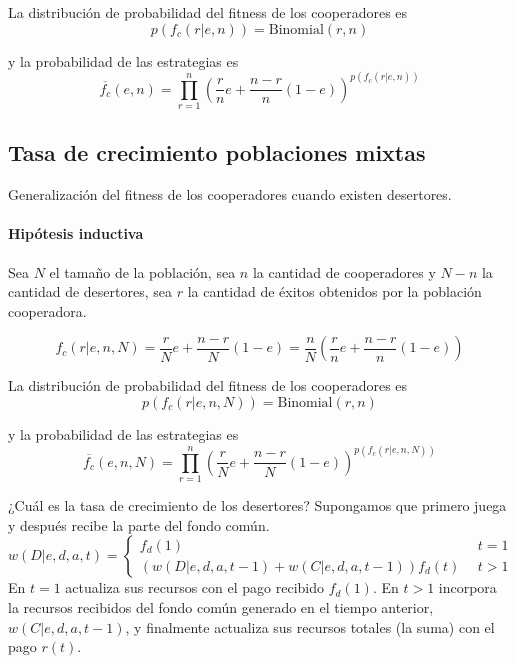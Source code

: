 \documentclass[a4paper,10pt]{article}
\begin{document}
La distribución de probabilidad del fitness de los cooperadores es
\begin{equation}
p(f_c(r|e,n)) = \text{Binomial}(r,n)
\end{equation}

y la probabilidad de las estrategias es
\begin{equation}
\overline{f_c}(e,n) = \prod_{r=1}^n \left( \frac{r}{n} e + \frac{n-r}{n}(1-e) \right)^{p(f_c(r|e,n))}
\end{equation}



\subsection{Tasa de crecimiento poblaciones mixtas}

Generalización del fitness de los cooperadores cuando existen desertores.

\paragraph{Hipótesis inductiva} Sea $N$ el tamaño de la población, sea $n$ la cantidad de cooperadores y $N-n$ la cantidad de desertores, sea  $r$ la cantidad de éxitos obtenidos por la población cooperadora.

\begin{equation}
f_c(r|e,n,N) =  \frac{r}{N} e + \frac{n-r}{N}(1-e) = \frac{n}{N} \left( \frac{r}{n} e + \frac{n-r}{n}(1-e) \right)
\end{equation}

La distribución de probabilidad del fitness de los cooperadores es
\begin{equation}
p(f_c(r|e,n,N)) = \text{Binomial}(r,n)
\end{equation}

y la probabilidad de las estrategias es
\begin{equation}
\overline{f_c}(e,n,N) = \prod_{r=1}^n \left( \frac{r}{N} e + \frac{n-r}{N}(1-e) \right)^{p(f_c(r|e,n,N))}
\end{equation}


¿Cuál es la tasa de crecimiento de los desertores?
Supongamos que primero juega y después recibe la parte del fondo común.
\begin{equation}
w(D|e,d,a,t) =
\begin{cases}
 f_d(1) & \ \  t=1 \\
 (w(D|e,d,a,t-1) + w(C|e,d,a,t-1)) f_d(t) & \ \  t>1
\end{cases}
\end{equation}
En $t=1$ actualiza sus recursos con el pago recibido $f_d(1)$.
En $t>1$ incorpora la recursos recibidos del fondo común generado en el tiempo anterior, $w(C|e,d,a,t-1)$, y finalmente actualiza sus recursos totales (la suma) con el pago $r(t)$.
\end{document}
